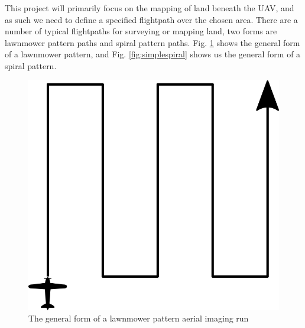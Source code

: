 This project will primarily focus on the mapping of land beneath the UAV, and as such we need to define a specified flightpath over the chosen area. There are a number of typical flightpaths for surveying or mapping land, two forms are lawnmower pattern paths and spiral pattern paths. Fig. \ref{fig:simplelawnmower} shows the general form of a lawnmower pattern, and Fig. \ref{fig:simplespiral} shows us the general form of a spiral pattern.

\begin{figure}[htbp!] 
\centering    
\includegraphics[width=0.5\textheight]{SimpleLawnmower}
\caption[Simple Lawnmower Pattern]{The general form of a lawnmower pattern aerial imaging run}
\label{fig:simplelawnmower}
\end{figure}

